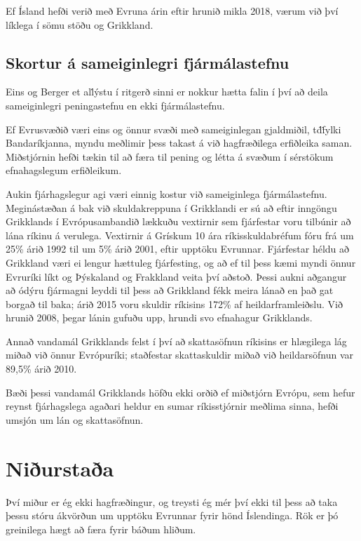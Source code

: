 \documentclass[a4paper]{article}
\begin{document}
Ef Ísland hefði verið með Evruna árin eftir hrunið mikla 2018, værum við því líklega í sömu stöðu og Grikkland.

\subsection{Skortur á sameiginlegri fjármálastefnu}

Eins og Berger et al\. lýstu í ritgerð sinni  er nokkur hætta falin í því að deila sameiginlegri peningastefnu en ekki fjármálastefnu.

Ef Evrusvæðið væri eins og önnur svæði með sameiginlegan gjaldmiðil, t\.d\. fylki Bandaríkjanna, myndu meðlimir þess takast á við hagfræðilega erfiðleika saman. Miðstjórnin hefði tækin til að færa til pening og létta á svæðum í sérstökum efnahagslegum erfiðleikum.\cite{fiscal_union}

Aukin fjárhagslegur agi væri einnig kostur við sameiginlega fjármálastefnu. Meginástæðan á bak við skuldakreppuna í Grikklandi er sú að eftir inngöngu Grikklands í Evrópusambandið lækkuðu vextirnir sem fjárfestar voru tilbúnir að lána ríkinu á verulega. Vextirnir á Grískum 10 ára ríkisskuldabréfum fóru frá um 25\% árið 1992 til um 5\% árið 2001, eftir upptöku Evrunnar. Fjárfestar héldu að Grikkland væri ei lengur hættuleg fjárfesting, og að ef til þess kæmi myndi önnur Evruríki líkt og Þýskaland og Frakkland veita því aðstoð. Þessi aukni aðgangur að ódýru fjármagni leyddi til þess að Grikkland fékk meira lánað en það gat borgað til baka; árið 2015 voru skuldir ríkisins 172\% af heildarframleiðslu. Við hrunið 2008, þegar lánin gufuðu upp, hrundi svo efnahagur Grikklands.\cite{vox_greece}

Annað vandamál Grikklands felst í því að skattasöfnun ríkisins er hlægilega lág miðað við önnur Evrópuríki; staðfestar skattaskuldir miðað við heildarsöfnun var 89,5\% árið 2010.\cite{oecd_greece_taxes}

Bæði þessi vandamál Grikklands höfðu ekki orðið ef miðstjórn Evrópu, sem hefur reynst fjárhagslega agaðari heldur en sumar ríkisstjórnir meðlima sinna, hefði umsjón um lán og skattasöfnun.

\section{Niðurstaða}

Því miður er ég ekki hagfræðingur, og treysti ég mér því ekki til þess að taka þessu stóru ákvörðun um upptöku Evrunnar fyrir hönd Íslendinga. Rök er þó greinilega hægt að færa fyrir báðum hliðum.

\newpage


\end{document}
